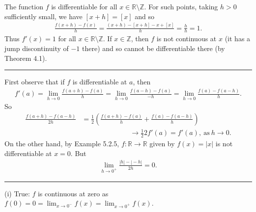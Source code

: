 \documentclass[letterpaper,10pt,english]{jupyterBook}
\begin{document}
\sphinxAtStartPar
The function \(f\) is differentiable for all \(x \in \mathbb{R} \setminus \mathbb{Z}\). For such points, taking \(h>0\) sufficiently small, we have
\([x+h]=[x]\) and so
\begin{equation*}
\begin{split}
\frac{f(x+h)-f(x)}{h} = \frac{(x + h)- [x + h] - x + [x]}{h} = \frac{h}{h}=1.
\end{split}
\end{equation*}
\sphinxAtStartPar
Thus \(f'(x) = 1\)  for all \(x \in \mathbb{R} \setminus \mathbb{Z}\). If \(x \in \mathbb{Z}\), then \(f\) is not continuous at \(x\)  (it has a jump discontinuity of \(-1\) there) and so cannot be differentiable there (by Theorem  4.1).


\bigskip\hrule\bigskip


\sphinxAtStartPar
{\hyperref[\detokenize{Problems:id45}]{}} First observe that if \(f\) is differentiable at \(a\), then
\begin{equation*}
\begin{split}
f'(a) = \lim_{h \rightarrow 0}\frac{f(a + h) - f(a)}{h} = \lim_{h \rightarrow 0}\frac{f(a - h) - f(a)}{-h} = \lim_{h \rightarrow 0}\frac{f(a) - f(a-h)}{h}.
\end{split}
\end{equation*}
\sphinxAtStartPar
So
\begin{align*}
\frac{f(a+ h) - f(a - h)}{2h} &=  \frac{1}{2}\left(\frac{f(a + h) - f(a)}{h} +  \frac{f(a) - f(a-h)}{h}\right) \\
&\hspace{7em}\rightarrow  \frac{1}{2}2f'(a) = f'(a),~\mbox{as}~h \rightarrow 0. 
\end{align*}
\sphinxAtStartPar
On the other hand, by Example 5.2.5, \(f:\mathbb{R}\to\mathbb{R}\) given by
\(f(x)=|x|\) is not differentiable at \(x=0\). But
\begin{equation*}
\begin{split}
\lim_{h \rightarrow 0^+} \displaystyle\frac{|h|-|{}-h|}{2h} =0.
\end{split}
\end{equation*}

\bigskip\hrule\bigskip


\sphinxAtStartPar
{\hyperref[\detokenize{Problems:id46}]{}}
(i) True: \(f\) is continuous at zero as \(f(0) = 0= \lim_{x \rightarrow 0^-}f(x) = \lim_{x \rightarrow 0^+}f(x)\).
\end{document}
